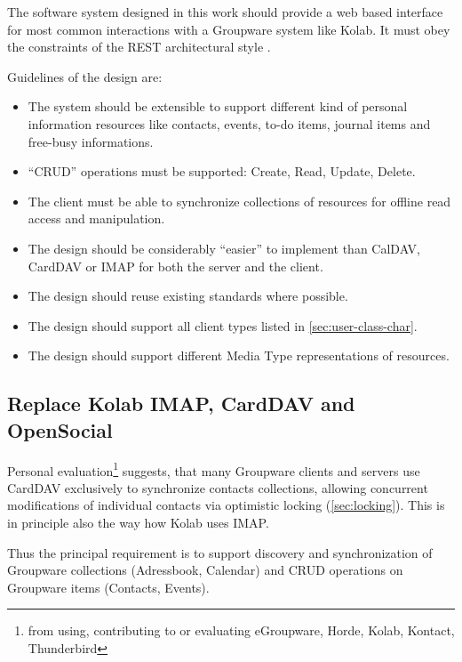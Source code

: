 \documentclass[11pt,a4paper,headsepline,twoside]{scrartcl}		%
\begin{document}
The software system designed in this work should provide a web based interface
for most common interactions with a Groupware system like Kolab. It must obey
the constraints of the REST architectural style \cite{Fielding2000}.

Guidelines of the design are:

\begin{itemize}
\item The system should be extensible to support different kind of personal
  information resources like contacts, events, to-do items, journal items and
  free-busy informations.
  \item ``CRUD'' operations must be supported: Create, Read, Update, Delete.
  \item The client must be able to synchronize collections of resources for
    offline read access and manipulation.
  \item The design should be considerably ``easier'' to implement than CalDAV,
    CardDAV or IMAP for both the server and the client.
  \item The design should reuse existing standards where possible.
  \item The design should support all client types listed in
    \autoref{sec:user-class-char}.
  \item The design should support different Media Type representations of
    resources.
\end{itemize}



\subsection{Replace Kolab IMAP, CardDAV and OpenSocial}
\label{sec:replacement-carddav}

Personal evaluation\footnote{from using, contributing to or evaluating
  eGroupware, Horde, Kolab, Kontact, Thunderbird} suggests, that many Groupware
clients and servers use CardDAV exclusively to synchronize contacts collections,
allowing concurrent modifications of individual contacts via optimistic locking
(\autoref{sec:locking}). This is in principle also the way how Kolab uses IMAP.

Thus the principal requirement is to support discovery and synchronization of
Groupware collections (Adressbook, Calendar) and CRUD operations on Groupware
items (Contacts, Events).
\end{document}
